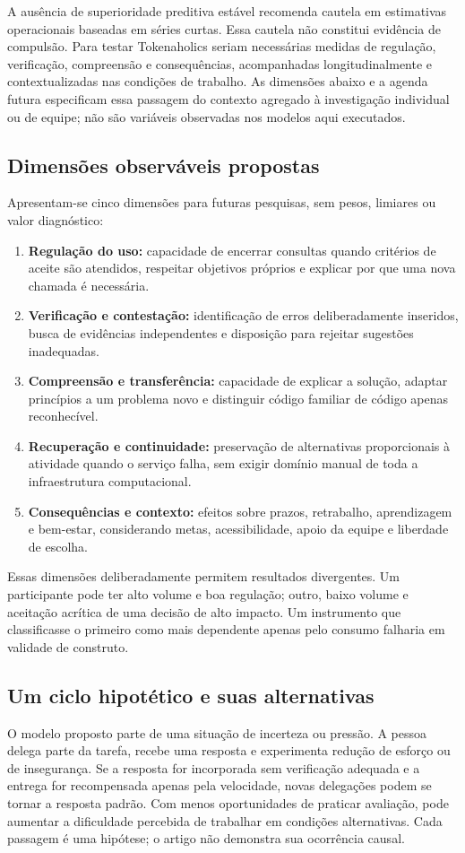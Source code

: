 \documentclass[11pt,a4paper]{article}
\begin{document}
A ausência de superioridade preditiva estável recomenda cautela em estimativas operacionais baseadas em séries curtas. Essa cautela não constitui evidência de compulsão. Para testar Tokenaholics seriam necessárias medidas de regulação, verificação, compreensão e consequências, acompanhadas longitudinalmente e contextualizadas nas condições de trabalho. As dimensões abaixo e a agenda futura especificam essa passagem do contexto agregado à investigação individual ou de equipe; não são variáveis observadas nos modelos aqui executados.

\subsection{Dimensões observáveis propostas}
Apresentam-se cinco dimensões para futuras pesquisas, sem pesos, limiares ou valor diagnóstico:
\begin{enumerate}
\item \textbf{Regulação do uso:} capacidade de encerrar consultas quando critérios de aceite são atendidos, respeitar objetivos próprios e explicar por que uma nova chamada é necessária.
\item \textbf{Verificação e contestação:} identificação de erros deliberadamente inseridos, busca de evidências independentes e disposição para rejeitar sugestões inadequadas.
\item \textbf{Compreensão e transferência:} capacidade de explicar a solução, adaptar princípios a um problema novo e distinguir código familiar de código apenas reconhecível.
\item \textbf{Recuperação e continuidade:} preservação de alternativas proporcionais à atividade quando o serviço falha, sem exigir domínio manual de toda a infraestrutura computacional.
\item \textbf{Consequências e contexto:} efeitos sobre prazos, retrabalho, aprendizagem e bem-estar, considerando metas, acessibilidade, apoio da equipe e liberdade de escolha.
\end{enumerate}
Essas dimensões deliberadamente permitem resultados divergentes. Um participante pode ter alto volume e boa regulação; outro, baixo volume e aceitação acrítica de uma decisão de alto impacto. Um instrumento que classificasse o primeiro como mais dependente apenas pelo consumo falharia em validade de construto.

\subsection{Um ciclo hipotético e suas alternativas}
O modelo proposto parte de uma situação de incerteza ou pressão. A pessoa delega parte da tarefa, recebe uma resposta e experimenta redução de esforço ou de insegurança. Se a resposta for incorporada sem verificação adequada e a entrega for recompensada apenas pela velocidade, novas delegações podem se tornar a resposta padrão. Com menos oportunidades de praticar avaliação, pode aumentar a dificuldade percebida de trabalhar em condições alternativas. Cada passagem é uma hipótese; o artigo não demonstra sua ocorrência causal.
\end{document}
